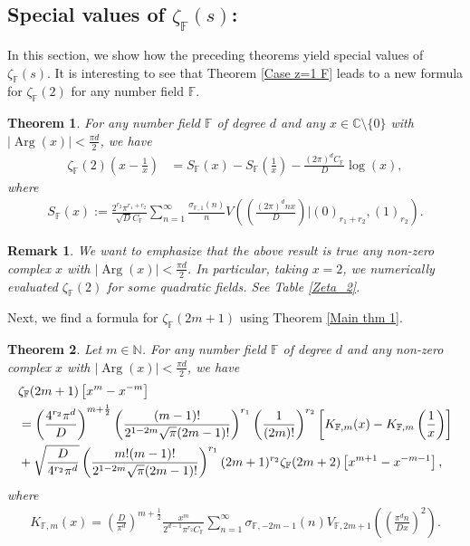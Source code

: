 \documentclass[12pt,reqno]{amsart}
\newcommand{\Arg}{\operatorname{Arg}}
\renewcommand{\(}{\left\(}
\renewcommand{\)}{\right\)}
\renewcommand{\[}{\left\[}
\renewcommand{\]}{\right\]}
\numberwithin{equation}{section}
\theoremstyle{plain}
\newtheorem{theorem}{Theorem}[section]
\newtheorem{remark}[]{Remark}
\begin{document}
\subsection{Special values of $\zeta_{\mathbb{F}}(s)$:} In this section, we show how the preceding theorems yield special values of $\zeta_{\mathbb{F}}(s)$. It is interesting to see that Theorem \ref{Case z=1 F} leads to a new formula for $\zeta_{\mathbb{F}}(2)$ for any number field $\mathbb{F}$.
\begin{theorem}\label{Dedekind at 2 thm}
For any number field $\mathbb{F}$ of degree $d$ and any $x \in \mathbb{C} \setminus \{0\}$ with $|\Arg(x)| < \frac{\pi d}{2}$, we have
\begin{align}\label{Dedekind zeta at 2}
\zeta_{\mathbb{F}}(2)\left(x-\frac{1}{x}\right) &= S_\mathbb{F}(x) - S_\mathbb{F}\left(\frac{1}{x}\right) - \frac{(2\pi)^{d}C_{\mathbb{F}}}{D}\log(x),
\end{align}
where
\begin{align*}
S_\mathbb{F}(x) := \frac{2^{r_2}\pi^{r_1+r_2}}{\sqrt{D}C_\mathbb{F}}\sum_{n=1}^{\infty}\frac{\sigma_{\mathbb{F}, 1}(n)}{n}V\left(\left(\frac{(2\pi)^{d} n x}{D}\right)\bigg|\left(0\right)_{r_1 + r_2}, (1)_{r_2}\right).
\end{align*}
\end{theorem}
\begin{remark}
We want to emphasize that the above result is true any non-zero complex $x$ with $|\Arg(x)| < \frac{\pi d}{2}$. In particular, taking $x=2$, we numerically evaluated $\zeta_{\mathbb{F}}(2)$ for some quadratic fields. See Table \ref{Zeta_2}.
\end{remark}
Next, we find a formula for $\zeta_{\mathbb{F}}(2m+1)$ using Theorem \ref{Main thm 1}.
\begin{theorem}\label{Dedekind zeta at 2m+1}
Let $m \in \mathbb{N}$. For any number field $\mathbb{F}$ of degree $d$ and any non-zero complex $x$ with $|\Arg(x)| < \frac{\pi d}{2}$, we have
\begin{align*}
& \zeta_{\mathbb{F}}(2m+1) \left[x^{m} - x^{-m}\right] \\
 &= \left( \frac{4^{r_2} \pi^d}{D}\right)^{m+\frac{1}{2}} \left( \frac{(m-1)!}{ 2^{1-2m} \sqrt{\pi} (2m-1)!} \right)^{r_1} \left(\frac{1}{(2m)!} \right)^{r_2}\left[K_{\mathbb{F}, m}(x) - K_{\mathbb{F}, m}\left(\frac{1}{x}\right)\right] \notag \\
&+ \sqrt{\frac{D}{4^{r_2}\pi^d}} \left(\frac{m! (m-1)!}{2^{1-2m} \sqrt{\pi} (2m-1)!} \right)^{r_1} (2m+1)^{r_2} \zeta_{\mathbb{F}}(2m+2) \left[x^{m+1} - x^{-m-1}\right],
\end{align*}
where
\begin{align*}
K_{\mathbb{F}, m}(x) = \left(\frac{D}{\pi^d}\right)^{m+\frac{1}{2}}\frac{x^m}{2^{d-1}\pi^{r_2}C_{\mathbb{F}}}\sum_{n=1}^{\infty}\sigma_{\mathbb{F}, -2m-1}(n)V_{\mathbb{F}, 2m+1}\left(\left(\frac{\pi^d n}{Dx}\right)^2\right).
\end{align*}
\end{theorem}
\end{document}
